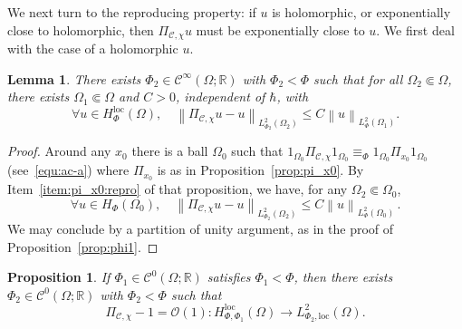 \documentclass{article}
\newtheorem{lemm}[theo]{Lemma}
\newtheorem{prop}[theo]{Proposition}
\newcommand{\loc}{\mathrm{loc}}
\newcommand{\norm}[1]{\left\|#1\right\|}
\newcommand{\lphi}{L^2_\Phi}
\newcommand{\RM}{\mathbb{R}}
\newcommand{\h}{\hbar}
\begin{document}
We next turn to the reproducing property: if $u$ is holomorphic, or
exponentially close to holomorphic, then $\Pi_{\mathcal{C}, \chi} u$
must be exponentially close to $u$. We first deal with the case of a
holomorphic $u$.
\begin{lemm}
  \label{lemm:pi_C-reproduisant}
  There exists $\Phi_2\in\mathscr{C}^\infty(\Omega;\RM)$ with
  $\Phi_2<\Phi$ such that for all $\Omega_2\Subset \Omega$, there
  exists $\Omega_1\Subset\Omega$ and $C>0$, independent of $\h$, with
  \begin{equation}
    \forall u\in H_\Phi^\loc(\Omega), \quad 
    \norm{\Pi_{\mathcal{C}, \chi} u - u}_{L^2_{\Phi_2}(\Omega_2)} 
    \leq C \norm{u}_{L^2_\Phi(\Omega_1)}.
  \end{equation}
\end{lemm}
\begin{proof}
  Around any $x_0$ there is a ball $\Omega_0$ such that
  $1_{\Omega_0}\Pi_{\mathcal{C}, \chi}1_{\Omega_0} \equiv_\Phi
  1_{\Omega_0}\Pi_{x_0}1_{\Omega_0}$
  (see~\eqref{equ:ac-a}) where $\Pi_{x_0}$ is as in
  Proposition~\ref{prop:pi_x0}. By Item~\ref{item:pi_x0:repro} of that
  proposition, we have, for any $\Omega_2\Subset \Omega_0$,
  \begin{equation}
    \forall u\in H_\Phi(\Omega_0), \quad 
    \norm{ \Pi_{\mathcal{C}, \chi} u - u}_{L^2_{\Phi_2}(\Omega_2)} \leq C \norm{u}_{\lphi(\Omega_0)}\,.
  \end{equation}
  We may conclude by a partition of unity argument, as in the proof of
  Proposition~\ref{prop:phi1}.
\end{proof}
\begin{prop}
  If $\Phi_1\in\mathscr{C}^0(\Omega;\RM)$ satisfies $\Phi_1<\Phi$,
  then there exists $\Phi_2\in\mathscr{C}^0(\Omega;\RM)$ with
  $\Phi_2<\Phi$ such that
  \[
  \Pi_{\mathcal{C}, \chi} - 1 = \mathcal{O}(1):
  H^\loc_{\Phi,\Phi_1}(\Omega) \to L_{ \Phi_2,\loc}^{2}(\Omega).
  \]
\end{prop}
\end{document}
